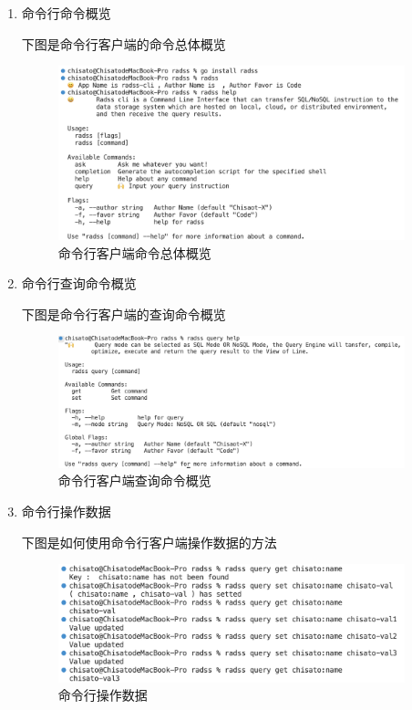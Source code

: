 	\begin{enumerate}
		
		\item 命令行命令概览
		
		下图是命令行客户端的命令总体概览
		\begin{figure}[H]
			\centering
			\includegraphics[width=0.95\textwidth]{images/radds_cli_all.png}
			\caption{命令行客户端命令总体概览}
			\label{cli_overall}
		\end{figure}

		\item 命令行查询命令概览 
		
		下图是命令行客户端的查询命令概览
		\begin{figure}[H]
			\centering
			\includegraphics[width=0.95\textwidth]{images/radds_query_all.png}
			\caption{命令行客户端查询命令概览}
			\label{cli_query_overall}
		\end{figure}
		
		\item 命令行操作数据
		
		下图是如何使用命令行客户端操作数据的方法
		\begin{figure}[H]
			\centering
			\includegraphics[width=0.95\textwidth]{images/radds_query.png}
			\caption{命令行操作数据}
			\label{cli_query}
		\end{figure}

	\end{enumerate}

